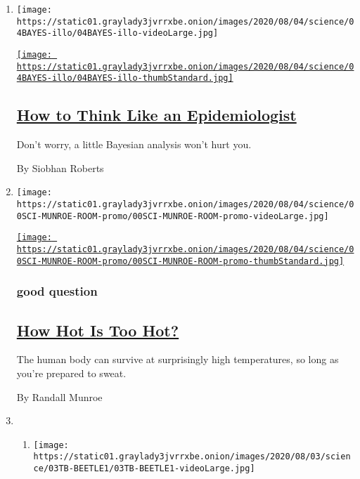 \begin{enumerate}
\def\labelenumi{\arabic{enumi}.}
\item
  \texttt{[image: https://static01.graylady3jvrrxbe.onion/images/2020/08/04/science/04BAYES-illo/04BAYES-illo-videoLarge.jpg]}

  \href{/2020/08/04/science/coronavirus-bayes-statistics-math.html}{\texttt{[image: https://static01.graylady3jvrrxbe.onion/images/2020/08/04/science/04BAYES-illo/04BAYES-illo-thumbStandard.jpg]}}

  \hypertarget{how-to-think-like-an-epidemiologist}{%
  \subsection{\texorpdfstring{\href{/2020/08/04/science/coronavirus-bayes-statistics-math.html}{How
  to Think Like an
  Epidemiologist}}{How to Think Like an Epidemiologist}}\label{how-to-think-like-an-epidemiologist}}

  Don't worry, a little Bayesian analysis won't hurt you.

  By Siobhan Roberts
\item
  \texttt{[image: https://static01.graylady3jvrrxbe.onion/images/2020/08/04/science/00SCI-MUNROE-ROOM-promo/00SCI-MUNROE-ROOM-promo-videoLarge.jpg]}

  \href{/2020/08/04/science/randall-munroe-xkcd-temperature.html}{\texttt{[image: https://static01.graylady3jvrrxbe.onion/images/2020/08/04/science/00SCI-MUNROE-ROOM-promo/00SCI-MUNROE-ROOM-promo-thumbStandard.jpg]}}

  \hypertarget{good-question}{%
  \subsubsection{good question}\label{good-question}}

  \hypertarget{how-hot-is-too-hot}{%
  \subsection{\texorpdfstring{\href{/2020/08/04/science/randall-munroe-xkcd-temperature.html}{How
  Hot Is Too Hot?}}{How Hot Is Too Hot?}}\label{how-hot-is-too-hot}}

  The human body can survive at surprisingly high temperatures, so long
  as you're prepared to sweat.

  By Randall Munroe
\item
  \begin{enumerate}
  \def\labelenumii{\arabic{enumii}.}
  \item
    \texttt{[image: https://static01.graylady3jvrrxbe.onion/images/2020/08/03/science/03TB-BEETLE1/03TB-BEETLE1-videoLarge.jpg]}


\end{enumerate}
\end{enumerate}
